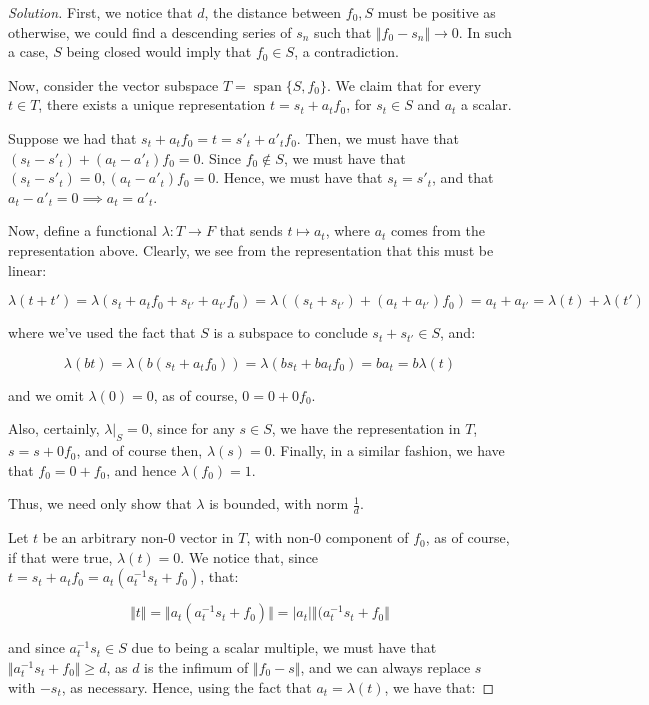\documentclass[10pt]{article}
\begin{document}
\begin{proof}[Solution]

First, we notice that $d$, the distance between $f_0, S$ must be positive as otherwise, we could find a descending series of $s_n$ such that $\Vert f_0 - s_n \Vert \to 0$. In such a case, $S$ being closed would imply that $f_0 \in S$, a contradiction.

Now, consider the vector subspace $T = \operatorname{span}\{ S, f_0 \}$. We claim that for every $t \in T$, there exists a unique representation $t = s_{t} + a_{t} f_0$,  for $s_{t} \in S$ and $a_{t}$ a scalar.

Suppose we had that $s_{t} + a_{t} f_0 = t = s'_t + a'_t f_0$. Then, we must have that $(s_t - s'_t) + (a_t - a'_t) f_0 = 0$. Since $f_0 \not \in S$, we must have that $(s_t - s'_t) = 0, (a_t - a'_t) f_0 = 0$. Hence, we must have that $s_t = s'_t$, and that $a_t - a'_t = 0 \implies a_t = a'_t$.

Now, define a functional $\lambda: T \to F$ that sends $t \mapsto a_t$, where $a_t$ comes from the representation above. Clearly, we see from the representation that this must be linear:

$$ \lambda( t + t') = \lambda(s_t + a_t f_0 + s_{t'} + a_{t'} f_0) = \lambda((s_t + s_{t'}) + (a_t + a_{t'}) f_0) = a_t + a_{t'} = \lambda(t) + \lambda(t')$$

where we've used the fact that $S$ is a subspace to conclude $s_t + s_{t'} \in S$, and:

$$ \lambda(bt) = \lambda(b(s_t + a_t f_0)) =\lambda(bs_t + ba_t f_0) = b a_t = b\lambda(t)$$

and we omit $\lambda(0)  = 0 $, as of course, $ 0 = 0 + 0f_0$. 

Also, certainly, $\lambda |_{S} = 0$, since for any $s \in S$, we have the representation in $T$, $s = s + 0 f_0$, and of course then, $\lambda(s) = 0$. Finally, in a similar fashion, we have that $f_0 = 0 + f_0$, and hence $\lambda(f_0) = 1$.

Thus, we need only show that $\lambda$ is bounded, with norm $\frac{1}{d}$.

Let $t$ be an arbitrary non-0 vector in $T$, with non-0 component of $f_0$, as of course, if that were true, $\lambda(t) = 0$. We notice that, since $t = s_t + a_t f_0 = a_t( a_t^{-1} s_t + f_0)$, that:

$$ \Vert t \Vert = \Vert a_t( a_t^{-1} s_t + f_0) \Vert = | a_t | \Vert (a_t^{-1} s_t + f_0 \Vert$$

and since $a_t^{-1} s_t \in S$ due to being a scalar multiple, we must have that $\Vert a_t^{-1} s_t + f_0 \Vert \geq d$, as $d$ is the infimum of $\Vert f_0 - s \Vert$, and we can always replace $s$ with $-s_t$, as necessary. Hence, using the fact that $a_t = \lambda(t)$, we have that:


\end{proof}
\end{document}
